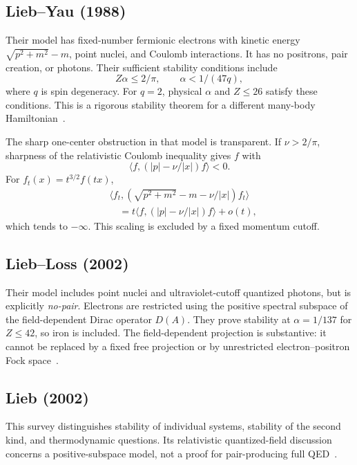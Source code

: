 \subsection{Lieb--Yau (1988)}
Their model has fixed-number fermionic electrons with kinetic energy
\(\sqrt{p^2+m^2}-m\), point nuclei, and Coulomb interactions. It has no
positrons, pair creation, or photons. Their sufficient stability conditions
include
\begin{equation}
Z\alpha\le2/\pi,\qquad \alpha<1/(47q),
\end{equation}
where \(q\) is spin degeneracy. For \(q=2\), physical \(\alpha\) and \(Z\le26\)
satisfy these conditions. This is a rigorous stability theorem for a
different many-body Hamiltonian~\cite{LY1988}.

The sharp one-center obstruction in that model is transparent. If
\(\nu>2/\pi\), sharpness of the relativistic Coulomb inequality gives \(f\)
with
\begin{equation}
\langle f,(|p|-\nu/|x|)f\rangle<0.
\end{equation}
For \(f_t(x)=t^{3/2}f(tx)\),
\begin{equation}
\begin{split}
&\langle f_t,(\sqrt{p^2+m^2}-m-\nu/|x|)f_t\rangle\\
&\hspace{1em}=
t\langle f,(|p|-\nu/|x|)f\rangle+o(t),
\end{split}
\end{equation}
which tends to \(-\infty\). This scaling is excluded by a fixed momentum cutoff.

\subsection{Lieb--Loss (2002)}
Their model includes point nuclei and ultraviolet-cutoff quantized photons,
but is explicitly \emph{no-pair}. Electrons are restricted using the positive
spectral subspace of the field-dependent Dirac operator \(D(A)\). They prove
stability at \(\alpha=1/137\) for \(Z\le42\), so iron is included. The
field-dependent projection is substantive: it cannot be replaced by a fixed
free projection or by unrestricted electron--positron Fock space~\cite{LL2002}.

\subsection{Lieb (2002)}
This survey distinguishes stability of individual systems, stability of the
second kind, and thermodynamic questions. Its relativistic quantized-field
discussion concerns a positive-subspace model, not a proof for pair-producing
full QED~\cite{Lieb2002}.

